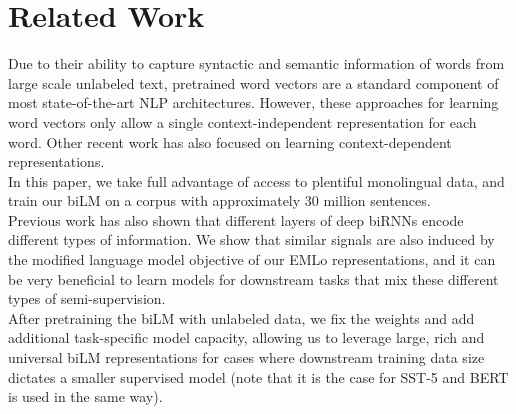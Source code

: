 \section{Related Work}

Due to their ability to capture syntactic and semantic information of words from
large scale unlabeled text, pretrained word vectors are a standard component of
most state-of-the-art NLP architectures. However, these approaches for learning
word vectors only allow a single context-independent representation for each
word. Other recent work has also focused on learning context-dependent
representations.\\
In this paper, we take full advantage of access to plentiful monolingual data,
and train our biLM on a corpus with approximately 30 million sentences.\\
Previous work has also shown that different layers of deep biRNNs encode
different types of information. We show that similar signals are also induced by
the modified language model objective of our EMLo representations, and it can be
very beneficial to learn models for downstream tasks that mix these different
types of semi-supervision.\\
After pretraining the biLM with unlabeled data, we fix the weights and add
additional task-specific model capacity, allowing us to leverage large, rich and
universal biLM representations for cases where downstream training data size
dictates a smaller supervised model (note that it is the case for SST-5 and BERT
is used in the same way).

